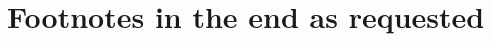 \documentclass[CHICAGO,Times1COL]{WileyNJDv5} %
\begin{document}


\section*{Footnotes in the end as requested}
\theendnotes



\iftoggle{TaFigOnEnd}{
\clearpage
\section*{Figures to be included in the end as requested}


\clearpage
\section*{Tables to be included  in the end as requested}

}
{}
\end{document}
